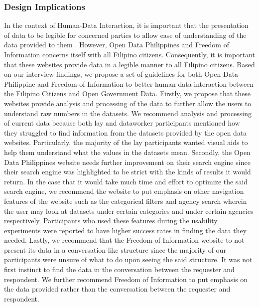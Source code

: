\documentclass{sigchi}
\begin{document}
\subsubsection{Design Implications}
In the context of Human-Data Interaction, it is important that the presentation of data to be legible for concerned parties to allow ease of understanding of the data provided to them \cite{mortier2014human}. However, Open Data Philippines and Freedom of Information concerns itself with all Filipino citizens. Consequently, it is important that these websites provide data in a legible manner to all Filipino citizens. Based on our interview findings, we propose a set of guidelines for both Open Data Philippine and Freedom of Information to better human data interaction between the Filipino Citizens and Open Government Data. Firstly, we propose that these websites provide analysis and processing of the data to further allow the users to understand raw numbers in the datasets. We recommend analysis and processing of current data because both lay and dataworker participants mentioned how they struggled to find information from the datasets provided by the open data websites. Particularly, the majority of the lay participants wanted visual aids to help them understand what the values in the datasets mean. Secondly, the Open Data Philippines website needs further improvement on their search engine since their search engine was highlighted to be strict with the kinds of results it would return. In the case that it would take much time and effort to optimize the said search engine, we recommend the website to put emphasis on other navigation features of the website such as the categorical filters and agency search wherein the user may look at datasets under certain categories and under certain agencies respectively. Participants who used these features during the usability experiments were reported to have higher success rates in finding the data they needed. Lastly, we recommend that the Freedom of Information website to not present its data in a conversation-like structure since the majority of our participants were unsure of what to do upon seeing the said structure. It was not first instinct to find the data in the conversation between the requester and respondent. We further recommend Freedom of Information to put emphasis on the data provided rather than the conversation between the requester and respondent.
\end{document}
